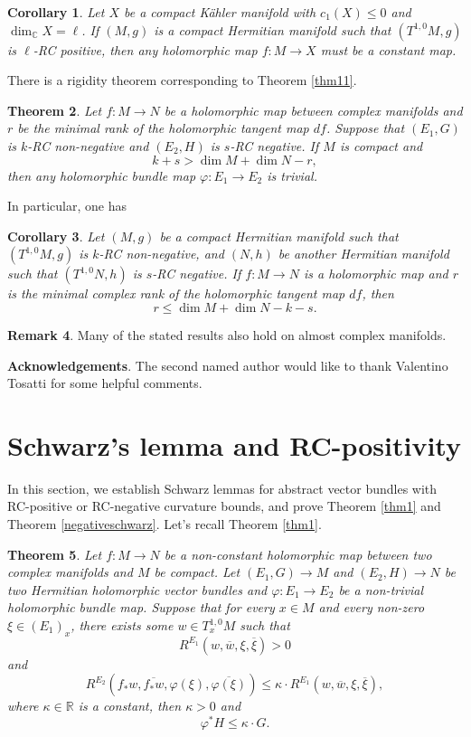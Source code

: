 \documentclass[12pt]{amsart}
\theoremstyle{plain}
\newtheorem{thm}{Theorem}[section]
\newtheorem{cor}[thm]{Corollary}
\theoremstyle{definition}
\newtheorem{remark}[thm]{Remark}
\newcommand{\btheorem}{\begin{thm}}
\newcommand{\etheorem}{\end{thm}}
\newcommand{\bcorollary}{\begin{cor}}
\newcommand{\ecorollary}{\end{cor}}
\newcommand{\bremark}{\begin{remark}}
\newcommand{\eremark}{\end{remark}}
\renewcommand{\bar}{\overline}
\renewcommand{\phi}{\varphi}
\newcommand{\beq}{\begin{equation}}
\newcommand{\eeq}{\end{equation}}
\renewcommand{\>}{\rightarrow}
\newcommand{\C}{{\mathbb C}}
\newcommand{\R}{{\mathbb R}}
\numberwithin{equation}{section} %
\begin{document}
\bcorollary  Let $X$ be a compact K\"ahler manifold with $c_1(X)\leq 0$ and $\dim_\C X=\ell $.  If  $(M,g)$ is a compact Hermitian manifold such that $(T^{1,0}M,g)$ is $\ell$-RC positive,  then any holomorphic map $f:M\rightarrow X$ must be a constant map.
\ecorollary

\baselineskip

\noindent There  is a  rigidity theorem corresponding to Theorem \ref{thm11}.


\btheorem\label{RCnegativity rigidity} Let  $f:M\>N$ be a holomorphic map between complex manifolds and $r$ be the minimal rank of the holomorphic tangent map $df$.
Suppose that  $(E_1,G)$ is $k$-RC non-negative and  $(E_2,H)$ is $s$-RC negative. If $M$ is compact and $$k+s>\dim M+\dim N-r,$$ then any  holomorphic bundle map $\phi:E_1\>E_2$ is  trivial.
\etheorem

\noindent
In particular,  one has
\bcorollary
Let $(M,g)$ be a compact Hermitian manifold such that $(T^{1,0}M,g)$ is  $k$-RC non-negative,
and $(N,h)$ be  another Hermitian manifold  such that $(T^{1,0}N,h)$ is $s$-RC negative.
If $f:M\to N$ is a holomorphic map and $r$ is the minimal complex rank of the holomorphic tangent map $df$,
then $$r\le \dim M+\dim N -k-s.$$
\ecorollary




\bremark Many of the stated results also hold on almost complex manifolds.
\eremark


\noindent\textbf{Acknowledgements}. The second named author  would like to thank  Valentino Tosatti for some
helpful comments.


\baselineskip




\section{Schwarz's lemma  and RC-positivity}
In this section, we establish Schwarz lemmas for abstract vector bundles with RC-positive or RC-negative curvature bounds, and prove  Theorem \ref{thm1} and Theorem \ref{negativeschwarz}. Let's recall Theorem \ref{thm1}.

\btheorem\label{thm2.1} Let $f:M\>N$ be a non-constant holomorphic map between two complex manifolds and $M$ be compact. Let
$(E_1,G)\>M$ and $(E_2,H)\>N$  be  two Hermitian holomorphic vector bundles  and $\phi:E_1\to E_2$ be  a non-trivial holomorphic bundle map.
Suppose that  for every $x\in M$ and every non-zero $\xi\in (E_1)_x$,
there exists some $w\in T_x^{1,0}M$ such that
\beq
R^{E_1}\left(w,\bar w,\xi,\bar \xi\right)>0\label{RC positive vb}
\eeq
and
\beq
R^{E_2}\left(f_*w,\bar{f_*w},\phi(\xi),\bar{\phi(\xi)}\right)\le \kappa\cdot R^{E_1}\left(w,\bar w,\xi,\bar \xi\right),\label{RC comparable vb}
\eeq
where $\kappa\in \R$ is a constant, then  $\kappa>0$ and
\beq
\phi^* H\le \kappa \cdot G.\label{main vb}
\eeq
\etheorem
\end{document}
